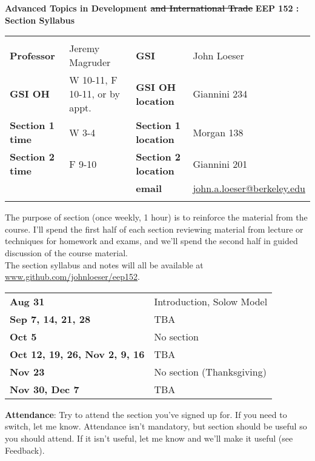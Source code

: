 \documentclass[twoside]{article}
\begin{document}
	
	{\bf Advanced Topics in Development \sout{and International Trade}} \hfill {\bf
		EEP 152 : Section Syllabus}
	
	\vspace{0.5em}
	
	\begin{tabular*}{\textwidth}{l@{\extracolsep{\fill}}ll@{\extracolsep{\fill}}l}
		\hline
		\multicolumn{4}{c}{} \\ [-0.5em]
		{\bf Professor} & Jeremy Magruder & {\bf GSI} & John Loeser \\
		{\bf GSI OH} & W 10-11, F 10-11, or by appt. & {\bf GSI OH location} & Giannini 234 \\
		{\bf Section 1 time} & W 3-4 & {\bf Section 1 location} & Morgan 138 \\
		{\bf Section 2 time} & F 9-10 & {\bf Section 2 location} & Giannini 201 \\
		& & {\bf email} & \href{mailto:john.a.loeser@berkeley.edu}{john.a.loeser@berkeley.edu} \\
		\multicolumn{4}{c}{} \\ [-0.5em]
		\hline
	\end{tabular*}
	\vspace{10pt} \bigskip
	
	The purpose of section (once weekly, 1 hour) is to reinforce the material from the course. I'll spend the first half of each section reviewing material from lecture or techniques for homework and exams, and we'll spend the second half in guided discussion of the course material. \\
	
	The section syllabus and notes will all be available at \href{http://www.github.com/johnloeser/eep152}{www.github.com/johnloeser/eep152}.
	
	\vspace{10pt}
	\begin{tabular}{ll}
		\bf{Aug 31}  &  Introduction, Solow Model \\
		\bf{Sep 7, 14, 21, 28} &  TBA \\
		\bf{Oct 5} &  No section \\
		\bf{Oct 12, 19, 26, Nov 2, 9, 16} &  TBA \\
		\bf{Nov 23} &  No section (Thanksgiving) \\
		\bf{Nov 30, Dec 7} &  TBA \\
	\end{tabular}
	\bigskip
	
	{\bf Attendance}: Try to attend the section you've signed up for. If you need to switch, let me know. Attendance isn't mandatory, but section should be useful so you should attend. If it isn't useful, let me know and we'll make it useful (see Feedback). \\
	
\end{document}
